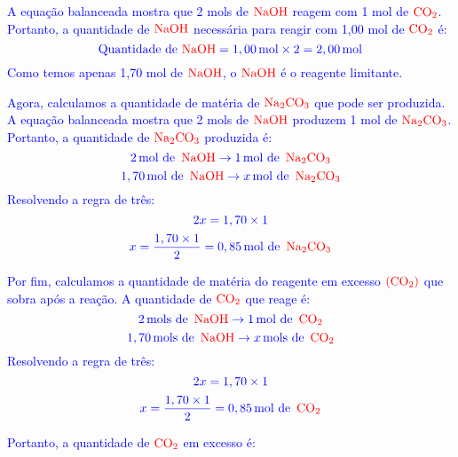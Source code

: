 \documentclass[a4paper, 12pt]{article}
\begin{document}
\begin{enumerate}
          \textcolor{blue}{A equação balanceada mostra que 2 mols de \(\textcolor{red}{\text{NaOH}}\) reagem com 1 mol de \(\textcolor{red}{\text{CO}_2}\). Portanto, a quantidade de \(\textcolor{red}{\text{NaOH}}\) necessária para reagir com 1,00 mol de \(\textcolor{red}{\text{CO}_2}\) é:}
          \[
              \textcolor{blue}{\text{Quantidade de } \textcolor{red}{\text{NaOH}} = 1,00 \, \text{mol} \times 2 = 2,00 \, \text{mol}}
          \]
          \textcolor{blue}{Como temos apenas 1,70 mol de \(\textcolor{red}{\text{NaOH}}\), o \(\textcolor{red}{\text{NaOH}}\) é o reagente limitante.}

          \textcolor{blue}{Agora, calculamos a quantidade de matéria de \(\textcolor{red}{\text{Na}_2\text{CO}_3}\) que pode ser produzida. A equação balanceada mostra que 2 mols de \(\textcolor{red}{\text{NaOH}}\) produzem 1 mol de \(\textcolor{red}{\text{Na}_2\text{CO}_3}\). Portanto, a quantidade de \(\textcolor{red}{\text{Na}_2\text{CO}_3}\) produzida é:}
          \[
              \textcolor{blue}{2 \, \text{mol de } \, \textcolor{red}{\text{NaOH}} \rightarrow 1 \, \text{mol de } \, \textcolor{red}{\text{Na}_2\text{CO}_3}}
          \]
          \[
              \textcolor{blue}{1,70 \, \text{mol de } \, \textcolor{red}{\text{NaOH}} \rightarrow x \, \text{mol de } \, \textcolor{red}{\text{Na}_2\text{CO}_3}}
          \]
          \textcolor{blue}{Resolvendo a regra de três:}
          \[
              \textcolor{blue}{2x = 1,70  \times 1}
          \]
          \[
              \textcolor{blue}{x = \frac{1,70 \times 1 }{2} = 0,85 \, \text{mol de } \, \textcolor{red}{\text{Na}_2\text{CO}_3}}
          \]

          \textcolor{blue}{Por fim, calculamos a quantidade de matéria do reagente em excesso \(\textcolor{red}{(\text{CO}_2)}\) que sobra após a reação. A quantidade de \(\textcolor{red}{\text{CO}_2}\) que reage é:}
          \[
              \textcolor{blue}{2 \, \text{mols de } \, \textcolor{red}{\text{NaOH}} \rightarrow 1 \, \text{mol de } \,\textcolor{red}{ \text{CO}_2}}
          \]
          \[
              \textcolor{blue}{ 1,70 \, \text{mols de } \, \textcolor{red}{\text{NaOH}} \rightarrow x \, \text{mols de } \, \textcolor{red}{\text{CO}_2}}
          \]
          \textcolor{blue}{Resolvendo a regra de três:}
          \[
              \textcolor{blue}{2x = 1,70  \times 1}
          \]
          \[
              \textcolor{blue}{x = \frac{1,70  \times 1}{2} = 0,85 \, \text{mol de } \, \textcolor{red}{\text{CO}_2}}
          \]

          \textcolor{blue}{Portanto, a quantidade de \(\textcolor{red}{\text{CO}_2}\) em excesso é:}


\end{enumerate}
\end{document}
